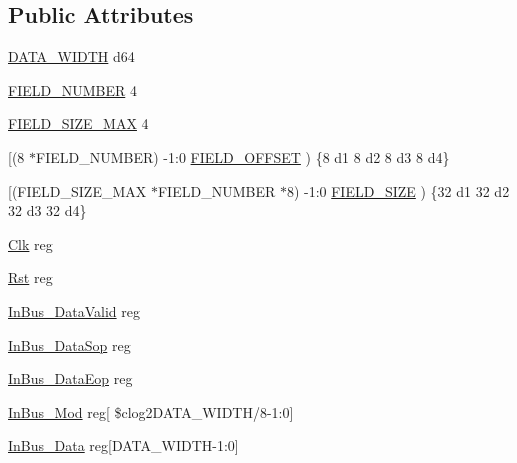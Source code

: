 \subsection*{Public Attributes}
\begin{DoxyCompactItemize}
\item 
\mbox{\hyperlink{enumpacket__parser__top__tb_ad84a0b625ec2bdeadc59aa113a293bb6}{D\+A\+T\+A\+\_\+\+W\+I\+D\+TH}} \textquotesingle{}d64
\item 
\mbox{\hyperlink{enumpacket__parser__top__tb_a677494ad5b2330357e320a2cf124446d}{F\+I\+E\+L\+D\+\_\+\+N\+U\+M\+B\+ER}} 4
\item 
\mbox{\hyperlink{enumpacket__parser__top__tb_ae35d6a8982056bf50516d906dbb9e03a}{F\+I\+E\+L\+D\+\_\+\+S\+I\+Z\+E\+\_\+\+M\+AX}} 4
\item 
\mbox{[}(8 $\ast$F\+I\+E\+L\+D\+\_\+\+N\+U\+M\+B\+ER) -\/1\+:0 \mbox{\hyperlink{enumpacket__parser__top__tb_a60eeda70b6175d07efba4e010068e436}{F\+I\+E\+L\+D\+\_\+\+O\+F\+F\+S\+ET}} ) \{8 \textquotesingle{}d1 8 \textquotesingle{}d2 8 \textquotesingle{}d3 8 \textquotesingle{}d4\}
\item 
\mbox{[}(F\+I\+E\+L\+D\+\_\+\+S\+I\+Z\+E\+\_\+\+M\+AX $\ast$F\+I\+E\+L\+D\+\_\+\+N\+U\+M\+B\+ER $\ast$8) -\/1\+:0 \mbox{\hyperlink{enumpacket__parser__top__tb_aed76c3233df9cc658acb293145ac9acf}{F\+I\+E\+L\+D\+\_\+\+S\+I\+ZE}} ) \{32 \textquotesingle{}d1 32 \textquotesingle{}d2 32 \textquotesingle{}d3 32 \textquotesingle{}d4\}
\item 
\mbox{\hyperlink{enumpacket__parser__top__tb_a1af6e678e75aaa480ebe640a45e498fa}{Clk}} reg
\item 
\mbox{\hyperlink{enumpacket__parser__top__tb_a369a0a6fe6b71f3bf0fc3cd81147ea25}{Rst}} reg
\item 
\mbox{\hyperlink{enumpacket__parser__top__tb_a5be38cc71eddcc3aa3a4dcef49ca39b1}{In\+Bus\+\_\+\+Data\+Valid}} reg
\item 
\mbox{\hyperlink{enumpacket__parser__top__tb_a0ab0663aa4e7c8bea0e2d0745b8e1e08}{In\+Bus\+\_\+\+Data\+Sop}} reg
\item 
\mbox{\hyperlink{enumpacket__parser__top__tb_a58a9c1e3f5ddb0a8221edac4ad93c6f3}{In\+Bus\+\_\+\+Data\+Eop}} reg
\item 
\mbox{\hyperlink{enumpacket__parser__top__tb_a38d81d687bc91dee664724efd779a51b}{In\+Bus\+\_\+\+Mod}} reg\mbox{[} \$clog2\+D\+A\+T\+A\+\_\+\+W\+I\+D\+TH/8-\/1\+:0\mbox{]}
\item 
\mbox{\hyperlink{enumpacket__parser__top__tb_a6c2ee8e7409b36aa0ae95ddc49160f40}{In\+Bus\+\_\+\+Data}} reg\mbox{[}D\+A\+T\+A\+\_\+\+W\+I\+D\+TH-\/1\+:0\mbox{]}

\end{DoxyCompactItemize}
